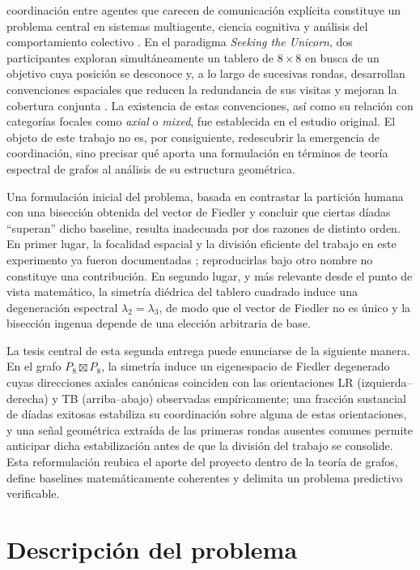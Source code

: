 \documentclass[journal]{IEEEtran}
\begin{document}
 coordinación entre agentes que carecen de comunicación explícita constituye un problema central en sistemas multiagente, ciencia cognitiva y análisis del comportamiento colectivo \cite{andrade2021,goldstone2024}. En el paradigma \emph{Seeking the Unicorn}, dos participantes exploran simultáneamente un tablero de $8\times8$ en busca de un objetivo cuya posición se desconoce y, a lo largo de sucesivas rondas, desarrollan convenciones espaciales que reducen la redundancia de sus visitas y mejoran la cobertura conjunta \cite{andrade2021}. La existencia de estas convenciones, así como su relación con categorías focales como \emph{axial} o \emph{mixed}, fue establecida en el estudio original. El objeto de este trabajo no es, por consiguiente, redescubrir la emergencia de coordinación, sino precisar qué aporta una formulación en términos de teoría espectral de grafos al análisis de su estructura geométrica.

Una formulación inicial del problema, basada en contrastar la partición humana con una bisección obtenida del vector de Fiedler y concluir que ciertas díadas ``superan'' dicho baseline, resulta inadecuada por dos razones de distinto orden. En primer lugar, la focalidad espacial y la división eficiente del trabajo en este experimento ya fueron documentadas \cite{andrade2021}; reproducirlas bajo otro nombre no constituye una contribución. En segundo lugar, y más relevante desde el punto de vista matemático, la simetría diédrica del tablero cuadrado induce una degeneración espectral $\lambda_2 = \lambda_3$, de modo que el vector de Fiedler no es único y la bisección ingenua depende de una elección arbitraria de base.

La tesis central de esta segunda entrega puede enunciarse de la siguiente manera. En el grafo $P_8 \boxtimes P_8$, la simetría induce un eigenespacio de Fiedler degenerado cuyas direcciones axiales canónicas coinciden con las orientaciones LR (izquierda--derecha) y TB (arriba--abajo) observadas empíricamente; una fracción sustancial de díadas exitosas estabiliza su coordinación sobre alguna de estas orientaciones, y una señal geométrica extraída de las primeras rondas ausentes comunes permite anticipar dicha estabilización antes de que la división del trabajo se consolide. Esta reformulación reubica el aporte del proyecto dentro de la teoría de grafos, define baselines matemáticamente coherentes y delimita un problema predictivo verificable.

\section{Descripción del problema}
\end{document}
